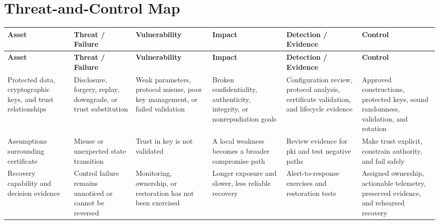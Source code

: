 \documentclass[11pt]{article}
\begin{document}
\section*{Threat-and-Control Map}
\begingroup\scriptsize\setlength{\tabcolsep}{2pt}
\begin{longtable}{>{\RaggedRight\arraybackslash}p{}>{\RaggedRight\arraybackslash}p{}>{\RaggedRight\arraybackslash}p{}>{\RaggedRight\arraybackslash}p{}>{\RaggedRight\arraybackslash}p{}>{\RaggedRight\arraybackslash}p{}}
\toprule\rowcolor{Navy}\color{white}\textbf{Asset} & \color{white}\textbf{Threat / Failure} & \color{white}\textbf{Vulnerability} & \color{white}\textbf{Impact} & \color{white}\textbf{Detection / Evidence} & \color{white}\textbf{Control}\\\midrule
\endfirsthead
\toprule\rowcolor{Navy}\color{white}\textbf{Asset} & \color{white}\textbf{Threat / Failure} & \color{white}\textbf{Vulnerability} & \color{white}\textbf{Impact} & \color{white}\textbf{Detection / Evidence} & \color{white}\textbf{Control}\\\midrule
\endhead
Protected data, cryptographic keys, and trust relationships & Disclosure, forgery, replay, downgrade, or trust substitution & Weak parameters, protocol misuse, poor key management, or failed validation & Broken confidentiality, authenticity, integrity, or nonrepudiation goals & Configuration review, protocol analysis, certificate validation, and lifecycle evidence & Approved constructions, protected keys, sound randomness, validation, and rotation\\\midrule
Assumptions surrounding certificate & Misuse or unexpected state transition & Trust in key is not validated & A local weakness becomes a broader compromise path & Review evidence for pki and test negative paths & Make trust explicit, constrain authority, and fail safely\\\midrule
Recovery capability and decision evidence & Control failure remains unnoticed or cannot be reversed & Monitoring, ownership, or restoration has not been exercised & Longer exposure and slower, less reliable recovery & Alert-to-response exercises and restoration tests & Assigned ownership, actionable telemetry, preserved evidence, and rehearsed recovery\\\midrule
\bottomrule
\end{longtable}
\endgroup
\end{document}
